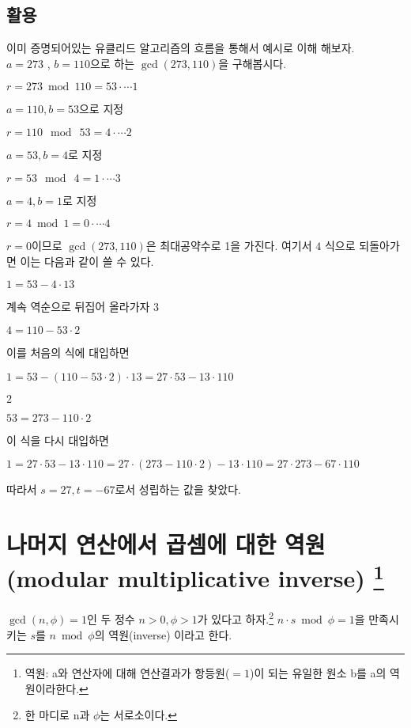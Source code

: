 \subsection{활용}
이미 증명되어있는 유클리드 알고리즘의 흐름을 통해서 예시로 이해 해보자.\\
$a=273$  , $b=110$으로 하는 $\gcd(273,110)$을 구해봅시다.
\begin{center}
    $r= 273\bmod  110 = 53 \cdot\cdots \mathit{1}$
\end{center}
$a=110 , b=53$으로 지정
\begin{center}
    $r= 110\:\bmod \: 53 = 4\cdot\cdots \mathit{2}$
\end{center}
$a=53 , b=4$로 지정
\begin{center}
    $r= 53\:\bmod \: 4 = 1 \cdot\cdots \mathit{3}$
\end{center}
$a=4 , b=1$로 지정
\begin{center}
    $r= 4\bmod  1 = 0\cdot\cdots \mathit{4}$
\end{center}
$r=0$이므로 $\gcd(273,110)$은 최대공약수로 1을 가진다.
여기서 $\mathit{4}$ 식으로 되돌아가면 이는 다음과 같이 쓸 수 있다.
\begin{center}
    $1=53 - 4\cdot13$
\end{center}
계속 역순으로 뒤집어 올라가자 $\mathit{3}$
\begin{center}
    $4=110 - 53\cdot2$
\end{center}
이를 처음의 식에 대입하면
\begin{center}
    $1=53 - (110 - 53\cdot2)\cdot13 =27\cdot53-13\cdot110 $
\end{center}
$\mathit{2}$
\begin{center}
    $53=273 - 110\cdot2$
\end{center}
이 식을 다시 대입하면
\begin{center}
    $1=27\cdot53-13\cdot110=27\cdot(273 - 110\cdot2)-13\cdot110=27\cdot273-67\cdot 110$
\end{center}
따라서 $s=27, t=-67$로서 성립하는 값을 찾았다.




\section{나머지 연산에서 곱셈에 대한 역원 (modular multiplicative inverse)
\protect\footnote{역원: a와 연산자에 대해 연산결과가 항등원($=1$)이 되는 유일한 원소 b를 a의 역원이라한다.}} 

\begin{dfn}[Inverse]
    $\gcd(n,\phi)=1$인 두 정수 $n>0, \phi>1$가 있다고 하자.\footnote{한 마디로 n과 $\phi$는 서로소이다.}
$n\cdot s\bmod  \phi =1 $을 만족시키는 $s$를 $n\bmod  \phi$의 역원(inverse) 이라고 한다.\par
\end{dfn}

